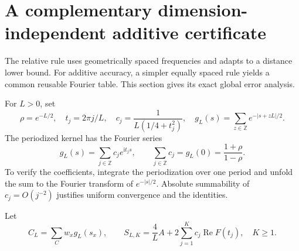 \documentclass[11pt]{article}
\theoremstyle{definition}
\theoremstyle{remark}
\DeclareMathOperator{\Rea}{Re}
\newcommand{\ii}{\mathrm i}
\newcommand{\Z}{\mathbb Z}
\begin{document}
\section{A complementary dimension-independent additive certificate}
\label{sec:periodic}

The relative rule uses geometrically spaced frequencies and adapts to a distance lower bound. For additive accuracy, a simpler equally spaced rule yields a common reusable Fourier table. This section gives its exact global error analysis.

For $L>0$, set
\begin{equation}
 \rho=e^{-L/2},\quad t_j=2\pi j/L,\quad
 c_j=\frac1{L(1/4+t_j^2)},\quad
 g_L(s)=\sum_{z\in\Z}e^{-|s+zL|/2}.
 \label{eq:perioddef}
\end{equation}
The periodized kernel has the Fourier series
\begin{equation}
 g_L(s)=\sum_{j\in\Z}c_j e^{\ii t_js},\qquad
 \sum_{j\in\Z}c_j=g_L(0)=\frac{1+\rho}{1-\rho}.
 \label{eq:periodseries}
\end{equation}
To verify the coefficients, integrate the periodization over one period and unfold the sum to the Fourier transform of $e^{-|s|/2}$. Absolute summability of $c_j=O(j^{-2})$ justifies uniform convergence and the identities.

Let
\begin{equation}
 C_L=\sum_Cw_xg_L(s_x),\qquad
 S_{L,K}=\frac4L A+2\sum_{j=1}^Kc_j\Rea F(t_j),\quad K\ge1.
 \label{eq:SK}
\end{equation}
\end{document}
